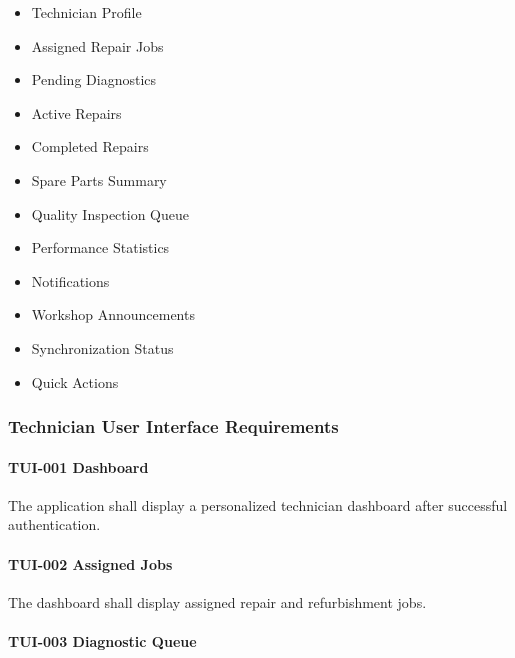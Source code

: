 \begin{itemize}

\item Technician Profile

\item Assigned Repair Jobs

\item Pending Diagnostics

\item Active Repairs

\item Completed Repairs

\item Spare Parts Summary

\item Quality Inspection Queue

\item Performance Statistics

\item Notifications

\item Workshop Announcements

\item Synchronization Status

\item Quick Actions

\end{itemize}


\subsubsection*{Technician User Interface Requirements}

\paragraph{TUI-001 Dashboard}

The application shall display a personalized technician dashboard after
successful authentication.

\paragraph{TUI-002 Assigned Jobs}

The dashboard shall display assigned repair and refurbishment jobs.

\paragraph{TUI-003 Diagnostic Queue}


